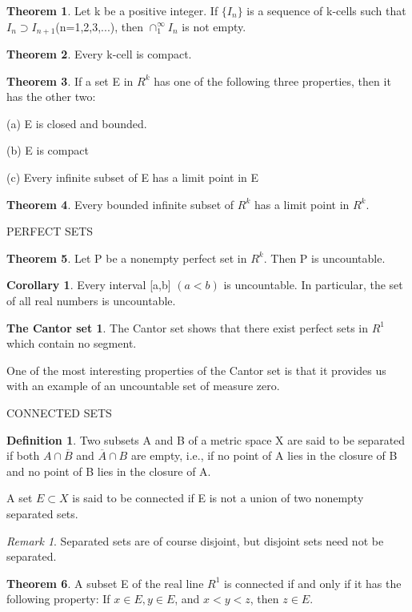\documentclass{article}
\theoremstyle{definition}
\newtheorem{defi}{Definition}
\newtheorem{theo}{Theorem}
\newtheorem{coro}{Corollary}
\newtheorem*{cantor}{The Cantor set}
\theoremstyle{remark}
\newtheorem{Rem}{Remark}
\begin{document}
	\begin{theo}
		Let k be a positive integer. If $\{I_n\}$ is a sequence of k-cells such that $I_n\supset I_{n+1}$(n=1,2,3,...), then $\cap^\infty_1 I_n$ is not empty.
	\end{theo}
	
	\begin{theo}
		Every k-cell is compact.
	\end{theo}
	
	
	\begin{theo}
		If a set E in $R^k$ has one of the following three properties, then it has the other two:
		
		(a) E is closed and bounded.
		
		(b) E is compact
		
		(c) Every infinite subset of E has a limit point in E 
	\end{theo}
	
	\begin{theo}
		Every bounded infinite subset of $R^k$ has a limit point in $R^k$.
	\end{theo}
	
	\newpage
	
	PERFECT SETS
	
	\begin{theo}
		Let P be a nonempty perfect set in $R^k$. Then P is uncountable.
	\end{theo}
	
	\begin{coro}
		Every interval [a,b] $(a<b)$ is uncountable. In particular, the set of all real numbers is uncountable.
	\end{coro}

	\begin{cantor}
		The Cantor set shows that there exist perfect sets in $R^1$ which contain no segment.
	\end{cantor}
	
	One of the most interesting properties of the Cantor set is that it provides us with an example of an uncountable set of measure zero.
	
	\newpage
	
	CONNECTED SETS
	
	\begin{defi}
		Two subsets A and B of a metric space X are said to be separated if both $A\cap \overline{B}$ and $\overline{A}\cap B$ are empty, i.e., if no point of A lies in the closure of B and no point of B lies in the closure of A.
		
		A set $E\subset X$ is said to be connected if E is not a union of two nonempty separated sets.
	\end{defi}
		
	\begin{Rem}
		Separated sets are of course disjoint, but disjoint sets need not be separated.
	\end{Rem}
	
	\begin{theo}
		A subset E of the real line $R^1$ is connected if and only if it has the following property: If $x\in E, y\in E$, and $x<y<z$, then $z\in E$. 
	\end{theo}
	
	
	
	
	
	
	
\end{document}
